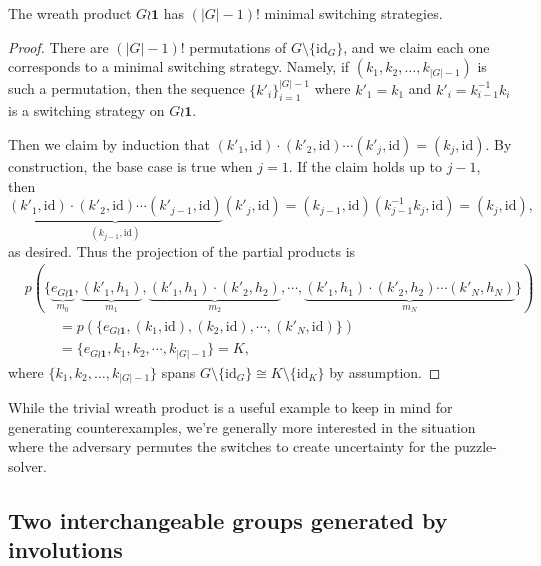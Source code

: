 \begin{proposition}
  The wreath product $G \wr \mathbf{1}$ has $(|G|-1)!$ minimal switching
  strategies.
  \label{prop:countingTrivialSS}
\end{proposition}
\begin{proof}
  There are $(|G| - 1)!$ permutations of $G \setminus \{\mathrm{id}_G\}$, and
  we claim each one corresponds to a minimal switching strategy. Namely,
  if $(k_1, k_2, \dots, k_{|G|-1})$ is such a permutation, then
  the sequence $\{k'_i\}_{i=1}^{|G|-1}$ where $k'_1 = k_1$ and
  $k'_i = k_{i-1}^{-1}k_i$ is a switching strategy on $G \wr \mathbf{1}$.

  Then we claim by induction that
  $(k'_1, \mathrm{id})\cdot(k'_2, \mathrm{id})\cdots(k'_j, \mathrm{id}) = (k_j, \mathrm{id})$.
  By construction, the base case is true when $j = 1$. If the claim holds up to
  $j-1$, then \begin{equation}
    \underbrace{
      (k'_1, \mathrm{id})\cdot(k'_2, \mathrm{id})\cdots(k'_{j-1}, \mathrm{id})
    }_{(k_{j-1}, \mathrm{id})}
    (k'_j, \mathrm{id})
    = (k_{j-1}, \mathrm{id})(k_{j-1}^{-1}k_j, \mathrm{id})
    = (k_j, \mathrm{id}),
  \end{equation} as desired.
  Thus the projection of the partial products is
  \begin{align}
    &p(\{
      \underbrace{e_{G \wr \mathbf{1}}}_{m_0},
      \underbrace{(k'_1, h_1)}_{m_1},
      \underbrace{(k'_1, h_1)\cdot(k'_2, h_2)}_{m_2},
      \cdots,
      \underbrace{(k'_1, h_1)\cdot(k'_2, h_2)\cdots(k'_N, h_N)}_{m_N}
    \}) \\
    & \hspace{1cm} =
    p(\{
      e_{G \wr \mathbf{1}},
      (k_1, \mathrm{id}),
      (k_2, \mathrm{id}),
      \cdots,
      (k'_N, \mathrm{id})
    \}) \\
    & \hspace{1cm} = \{e_{G \wr \mathbf{1}}, k_1, k_2, \cdots,k_{|G|-1}\} = K,
  \end{align}
  where $\{k_1, k_2, \dots, k_{|G|-1}\}$ spans
  $G \setminus \{\mathrm{id}_G\} \cong K \setminus \{\mathrm{id}_K\}$ by
  assumption.
\end{proof}

While the trivial wreath product is a useful example to keep in mind for
generating counterexamples, we're generally more interested in the situation
where the adversary permutes the switches to create uncertainty for the
puzzle-solver.

\subsection{Two interchangeable groups generated by involutions}

